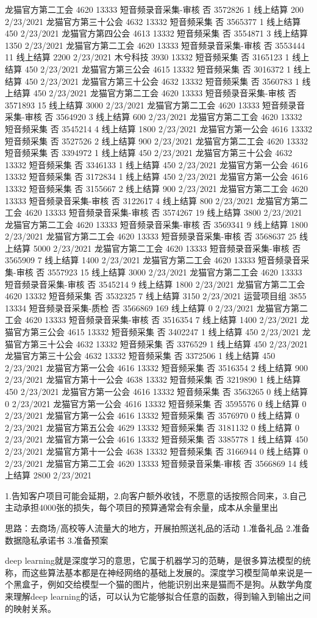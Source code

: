 龙猫官方第二工会	4620	13333	短音频录音采集-审核	否	3572826	1	线上结算	200	2/23/2021
龙猫官方第三十公会	4632	13332	短音频采集	否	3565377	1	线上结算	450	2/23/2021
龙猫官方第四公会	4613	13332	短音频采集	否	3554871	3	线上结算	1350	2/23/2021
龙猫官方第二工会	4620	13333	短音频录音采集-审核	否	3553444	11	线上结算	2200	2/23/2021
木兮科技	3930	13332	短音频采集	否	3165123	1	线上结算	450	2/23/2021
龙猫官方第三公会	4615	13332	短音频采集	否	3016372	1	线上结算	450	2/23/2021
龙猫官方第三十公会	4632	13332	短音频采集	否	3560783	1	线上结算	450	2/23/2021
龙猫官方第二工会	4620	13333	短音频录音采集-审核	否	3571893	15	线上结算	3000	2/23/2021
龙猫官方第二工会	4620	13333	短音频录音采集-审核	否	3564920	3	线上结算	600	2/23/2021
龙猫官方第二工会	4620	13332	短音频采集	否	3545214	4	线上结算	1800	2/23/2021
龙猫官方第一公会	4616	13332	短音频采集	否	3527526	2	线上结算	900	2/23/2021
龙猫官方第二工会	4620	13332	短音频采集	否	3394972	1	线上结算	450	2/23/2021
龙猫官方第三十公会	4632	13332	短音频采集	否	3346133	1	线上结算	450	2/23/2021
龙猫官方第一公会	4616	13332	短音频采集	否	3172834	1	线上结算	450	2/23/2021
龙猫官方第一公会	4616	13332	短音频采集	否	3155667	2	线上结算	900	2/23/2021
龙猫官方第二工会	4620	13333	短音频录音采集-审核	否	3122617	4	线上结算	800	2/23/2021
龙猫官方第二工会	4620	13333	短音频录音采集-审核	否	3574267	19	线上结算	3800	2/23/2021
龙猫官方第二工会	4620	13333	短音频录音采集-审核	否	3569341	9	线上结算	1800	2/23/2021
龙猫官方第二工会	4620	13333	短音频录音采集-审核	否	3568637	25	线上结算	5000	2/23/2021
龙猫官方第二工会	4620	13333	短音频录音采集-审核	否	3565909	7	线上结算	1400	2/23/2021
龙猫官方第二工会	4620	13333	短音频录音采集-审核	否	3557923	15	线上结算	3000	2/23/2021
龙猫官方第二工会	4620	13333	短音频录音采集-审核	否	3545214	9	线上结算	1800	2/23/2021
龙猫官方第二工会	4620	13332	短音频采集	否	3532325	7	线上结算	3150	2/23/2021
运营项目组	3855	13334	短音频录音采集-质检	否	3566869	169	线上结算	0	2/23/2021
龙猫官方第二工会	4620	13333	短音频录音采集-审核	否	3516354	7	线上结算	1400	2/23/2021
龙猫官方第三公会	4615	13332	短音频采集	否	3402247	1	线上结算	450	2/23/2021
龙猫官方第三十公会	4632	13332	短音频采集	否	3376529	1	线上结算	450	2/23/2021
龙猫官方第三十公会	4632	13332	短音频采集	否	3372506	1	线上结算	450	2/23/2021
龙猫官方第一公会	4616	13332	短音频采集	否	3516354	2	线上结算	900	2/23/2021
龙猫官方第十一公会	4638	13332	短音频采集	否	3219890	1	线上结算	450	2/23/2021
龙猫官方第一公会	4616	13332	短音频采集	否	3563265	0	线上结算	0	2/23/2021
龙猫官方第一公会	4616	13332	短音频采集	否	3595576	0	线上结算	0	2/23/2021
龙猫官方第一公会	4616	13332	短音频采集	否	3576970	0	线上结算	0	2/23/2021
龙猫官方第五公会	4629	13332	短音频采集	否	3181132	0	线上结算	0	2/23/2021
龙猫官方第一公会	4616	13332	短音频采集	否	3385778	1	线上结算	450	2/23/2021
龙猫官方第十一公会	4638	13332	短音频采集	否	3166944	0	线上结算	0	2/23/2021
龙猫官方第二工会	4620	13333	短音频录音采集-审核	否	3566869	14	线上结算	2800	2/23/2021


1.告知客户项目可能会延期，2.向客户额外收钱，不愿意的话按照合同来，3.自己主动承担4000张的损失，每个项目的预算通常会有余量，成本从余量里出

思路：去商场/高校等人流量大的地方，开展拍照送礼品的活动 1.准备礼品 2.准备数据隐私承诺书 3.准备预案

deep learning就是深度学习的意思，它属于机器学习的范畴，是很多算法模型的统称，而这些算法基本都是在神经网络的基础上发展的。深度学习模型简单来说是一个黑盒子，例如交给模型一个猫的图片，他能识别出来是猫而不是狗。从数学角度来理解deep learning的话，可以认为它能够拟合任意的函数，得到输入到输出之间的映射关系。